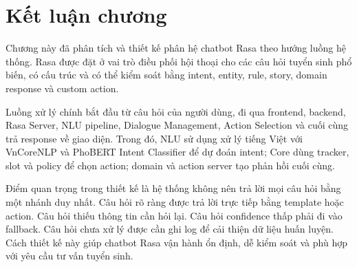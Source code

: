 \section{Kết luận chương}

Chương này đã phân tích và thiết kế phân hệ chatbot Rasa theo hướng luồng hệ thống. Rasa được đặt ở vai trò điều phối hội thoại cho các câu hỏi tuyển sinh phổ biến, có cấu trúc và có thể kiểm soát bằng intent, entity, rule, story, domain response và custom action.

Luồng xử lý chính bắt đầu từ câu hỏi của người dùng, đi qua frontend, backend, Rasa Server, NLU pipeline, Dialogue Management, Action Selection và cuối cùng trả response về giao diện. Trong đó, NLU sử dụng xử lý tiếng Việt với VnCoreNLP và PhoBERT Intent Classifier để dự đoán intent; Core dùng tracker, slot và policy để chọn action; domain và action server tạo phản hồi cuối cùng.

Điểm quan trọng trong thiết kế là hệ thống không nên trả lời mọi câu hỏi bằng một nhánh duy nhất. Câu hỏi rõ ràng được trả lời trực tiếp bằng template hoặc action. Câu hỏi thiếu thông tin cần hỏi lại. Câu hỏi confidence thấp phải đi vào fallback. Câu hỏi chưa xử lý được cần ghi log để cải thiện dữ liệu huấn luyện. Cách thiết kế này giúp chatbot Rasa vận hành ổn định, dễ kiểm soát và phù hợp với yêu cầu tư vấn tuyển sinh.

